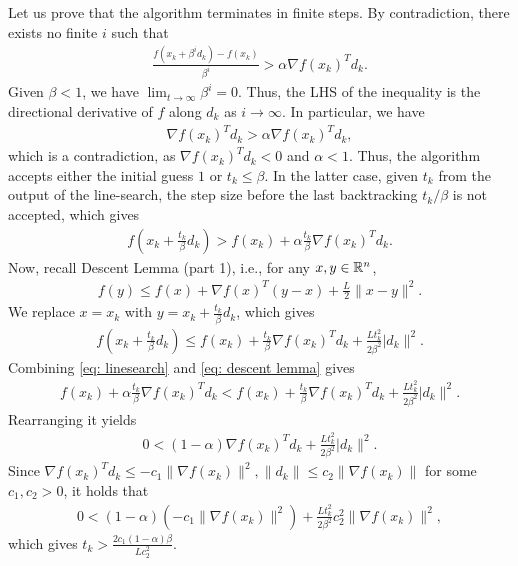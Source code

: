 \documentclass{ExerciseSheet}
\begin{document}
\begin{solution}
    Let us prove that the algorithm terminates in finite steps. By contradiction, there exists no finite $i$ such that
    \begin{align*}
        \frac{f(x_k+\beta^id_k)-f(x_k)}{\beta^i}>\alpha \nabla f(x_k)^Td_k.
    \end{align*}
    Given $\beta<1$, we have $\lim_{t\rightarrow \infty}\beta^i = 0$. Thus, the LHS of the inequality is the directional derivative of $f$ along $d_k$ as $i\rightarrow \infty$. In particular, we have
    \begin{align*}
        \nabla f(x_k)^T d_k > \alpha \nabla f(x_k)^T d_k,
    \end{align*}
    which is a contradiction, as $\nabla f(x_k)^T d_k<0$ and $\alpha <1$. Thus, the algorithm accepts either the initial guess $1$ or $t_k\leq \beta$. In the latter case, given $t_k$ from the output of the line-search, the step size before the last backtracking $t_k/\beta$ is not accepted, which gives 
    \begin{align}\label{eq: linesearch}
        f\left(x_k + \frac{t_k}{\beta}d_k\right) >f(x_k) + \alpha \frac{t_k}{\beta} \nabla f(x_k)^T d_k.
    \end{align}
    Now, recall Descent Lemma (part 1), i.e., for any $x,y \in\mathbb{R}^n$, 
    \begin{align*}
        f(y) \leq f(x) + \nabla f(x)^T ( y-x)+\frac{L}{2}\lVert x-y\rVert^2.
    \end{align*}
    We replace $x=x_k$ with $y=x_k+\frac{t_k}{\beta}d_k$, which gives
    \begin{align}\label{eq: descent lemma}
        f\left(x_k + \frac{t_k}{\beta}d_k\right) \leq f(x_k)+\frac{t_k}{\beta}\nabla f(x_k)^T d_k+\frac{Lt_k^2}{2\beta^2}\lvert d_k\rVert^2.
    \end{align}
    Combining \eqref{eq: linesearch} and \eqref{eq: descent lemma} gives
    \begin{align*}
        f(x_k) + \alpha \frac{t_k}{\beta} \nabla f(x_k)^T d_k < f(x_k)+\frac{t_k}{\beta}\nabla f(x_k)^T d_k+\frac{Lt_k^2}{2\beta^2}\lvert d_k\rVert^2.
    \end{align*}
    Rearranging it yields
    \begin{align*}
        0<(1-\alpha)\nabla f(x_k)^T d_k +\frac{Lt_k^2}{2\beta^2}\lvert d_k\rVert^2.
    \end{align*}
    Since $\nabla f(x_k)^Td_k \leq -c_1 \lVert \nabla f(x_k)\rVert^2,  \lVert d_k \rVert \leq c_2 \lVert \nabla f(x_k)\rVert$ for some $c_1,c_2>0$, it holds that
    \begin{align*}
        0<(1-\alpha)(-c_1 \lVert \nabla f(x_k)\rVert^2)  +\frac{Lt_k^2}{2\beta^2}c_2^2 \lVert \nabla f(x_k)\rVert^2,
    \end{align*}
    which gives $t_k > \frac{2 c_1 (1-\alpha)\beta}{Lc_2^2}$. 
\end{solution}
\end{document}
